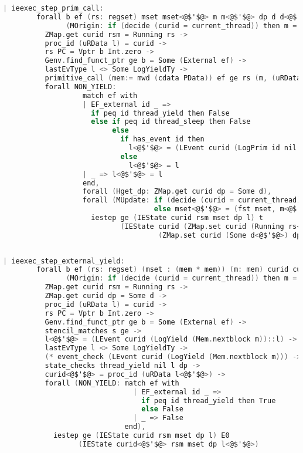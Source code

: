 \begin{lstlisting}[language=C]
    | ieexec_step_prim_call:
        forall b ef (rs: regset) mset mset<@$'$@> m m<@$'$@> dp d d<@$'$@> ds<@$'$@> t rs<@$'$@> curid rsm l l<@$'$@>
               (MOrigin: if (decide (curid = current_thread)) then m = fst mset else m = snd mset),
          ZMap.get curid rsm = Running rs ->
          proc_id (uRData l) = curid ->
          rs PC = Vptr b Int.zero ->
          Genv.find_funct_ptr ge b = Some (External ef) ->
          lastEvType l <> Some LogYieldTy ->
          primitive_call (mem:= mwd (cdata PData)) ef ge rs (m, (uRData l, d)) t rs<@$'$@> (m<@$'$@>, (ds<@$'$@>, d<@$'$@>)) ->
          forall NON_YIELD: 
                   match ef with
                   | EF_external id _ => 
                     if peq id thread_yield then False
                     else if peq id thread_sleep then False
                          else
                            if has_event id then
                              l<@$'$@> = (LEvent curid (LogPrim id nil 0 (snap_func d)) :: l)
                            else
                              l<@$'$@> = l
                   | _ => l<@$'$@> = l
                   end,
                   forall (Hget_dp: ZMap.get curid dp = Some d),
                   forall (MUpdate: if (decide (curid = current_thread)) then mset<@$'$@> = (m<@$'$@>, snd mset)
                                    else mset<@$'$@> = (fst mset, m<@$'$@>)),
                     iestep ge (IEState curid rsm mset dp l) t 
                            (IEState curid (ZMap.set curid (Running rs<@$'$@>) rsm) mset<@$'$@> 
                                     (ZMap.set curid (Some d<@$'$@>) dp) l<@$'$@>)
                            
\end{lstlisting}

\begin{lstlisting}[language=C]
    | ieexec_step_external_yield:
        forall b ef (rs: regset) (mset : (mem * mem)) (m: mem) curid curid<@$'$@> rsm s l l<@$'$@> dp d
               (MOrigin: if (decide (curid = current_thread)) then m = fst mset else m = snd mset),
          ZMap.get curid rsm = Running rs ->
          ZMap.get curid dp = Some d ->
          proc_id (uRData l) = curid ->
          rs PC = Vptr b Int.zero ->
          Genv.find_funct_ptr ge b = Some (External ef) ->
          stencil_matches s ge ->
          l<@$'$@> = (LEvent curid (LogYield (Mem.nextblock m))::l) ->
          lastEvType l <> Some LogYieldTy ->
          (* event_check (LEvent curid (LogYield (Mem.nextblock m))) -> *)
          state_checks thread_yield nil l dp ->
          curid<@$'$@> = proc_id (uRData l<@$'$@>) ->
          forall (NON_YIELD: match ef with
                               | EF_external id _ => 
                                 if peq id thread_yield then True
                                 else False
                               | _ => False
                             end),
            iestep ge (IEState curid rsm mset dp l) E0
                  (IEState curid<@$'$@> rsm mset dp l<@$'$@>)

\end{lstlisting}

